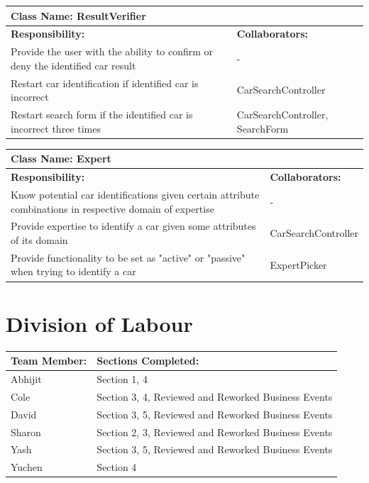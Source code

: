 \documentclass[12pt]{article}
\begin{document}
	\begin{table}[ht]
		\centering
		\begin{tabular}{|p{5cm}|p{5cm}|}
			\hline
			\multicolumn{2}{|l|}{\textbf{Class Name:} ResultVerifier} \\
			\hline
			\textbf{Responsibility:} & \textbf{Collaborators:} \\
			\hline
			Provide the user with the ability to confirm or deny the identified car result & -\\
			\hline
			Restart car identification if identified car is incorrect & CarSearchController\\
			\hline
			Restart search form if the identified car is incorrect three times & CarSearchController, SearchForm\\
			\hline
		\end{tabular}
	\end{table}

	\begin{table}[ht]
		\centering
		\begin{tabular}{|p{5cm}|p{5cm}|}
			\hline
			\multicolumn{2}{|l|}{\textbf{Class Name:} Expert} \\
			\hline
			\textbf{Responsibility:} & \textbf{Collaborators:} \\
			\hline
			Know potential car identifications given certain attribute combinations in respective domain of expertise & -\\
			\hline
			Provide expertise to identify a car given some attributes of its domain & CarSearchController\\
			\hline
			Provide functionality to be set as "active" or "passive" when trying to identify a car & ExpertPicker\\
			\hline
		\end{tabular}
	\end{table}

\FloatBarrier
\appendix
\section{Division of Labour}
\label{sec:division_of_labour}
\begin{table}[ht]
	\centering
	\begin{tabular}{|p{5cm}|p{5cm}|}
		\hline
		\textbf{Team Member:} & \textbf{Sections Completed:}\\
		\hline
		Abhijit & Section 1, 4\\
		\hline
		Cole & Section 3, 4, Reviewed and Reworked Business Events\\
		\hline
		David & Section 3, 5, Reviewed and Reworked Business Events\\
		\hline
		Sharon & Section 2, 3, Reviewed and Reworked Business Events\\
		\hline
		Yash & Section 3, 5, Reviewed and Reworked Business Events\\
		\hline
		Yuchen & Section 4\\
		\hline
	\end{tabular}
\end{table}
\end{document}
